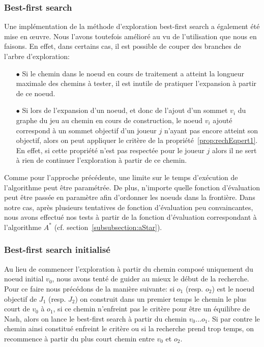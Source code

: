 \subsubsection*{Best-first search}

Une implémentation de la méthode d'exploration best-first search a également été mise en \oe uvre. Nous l'avons toutefois amélioré au vu de l'utilisation que nous en faisons. En effet, dans certains cas, il est possible de couper des branches de l'arbre d'exploration:

\begin{itemize}
	\item[$\bullet$] Si le chemin dans le noeud en cours de traitement a atteint la longueur maximale des chemins à tester, il est inutile de pratiquer l'expansion à partir de ce noeud.
	\item[$\bullet$]Si lors de l'expansion d'un noeud, et donc de l'ajout d'un sommet $v_i$ du graphe du jeu au chemin en cours de construction, le noeud  $v_i$ ajouté correspond à un sommet objectif d'un joueur $j$ n'ayant pas encore atteint son objectif, alors on peut appliquer le critère de la propriété~\ref{prop:rechEqpert1}. En effet, si cette propriété n'est pas respectée pour le joueur $j$ alors il ne sert à rien de continuer l'exploration à partir de ce chemin.
\end{itemize}

Comme pour l'approche précédente, une limite sur le temps d'exécution de l'algorithme peut être paramétrée. De plus, n'importe quelle fonction d'évaluation peut être passée en paramètre afin d'ordonner les noeuds dans la frontière. Dans notre cas, après plusieurs tentatives de fonction d'évaluation peu convaincantes, nous avons effectué nos tests à partir de la fonction d'évaluation correspondant à l'algorithme $A^*$ (cf. section~\ref{subsubsection:aStar}).

\subsubsection*{Best-first search initialisé}

Au lieu de commencer l'exploration à partir du chemin composé uniquement du noeud initial $v_0$, nous avons tenté de guider au mieux le début de la recherche. Pour ce faire nous précédons de la manière suivante: si $o_1$ (resp. $o_2$) est le noeud objectif de $J_1$ (resp. $J_2$) on construit dans un premier temps le chemin le plus court de $v_0$ à $o_1$, si ce chemin n'enfreint pas le critère pour être un équilibre de Nash, alors on lance le best-first search à partir du chemin $v_0 ... o_1$. Si par contre le chemin ainsi constitué enfreint le critère ou si la recherche prend trop temps, on recommence à partir du plus court chemin entre $v_0$ et $o_2$.




	